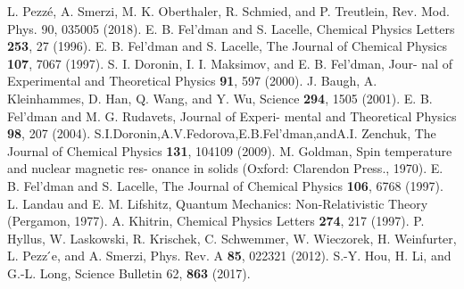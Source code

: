 \documentclass[%
 reprint,
superscriptaddress,
 amsmath,amssymb,
]{revtex4-2}
\begin{document}
\begin{thebibliography}{31}
    L. Pezz{\'e}, A. Smerzi, M. K. Oberthaler, R. Schmied, and P. Treutlein, Rev. Mod. Phys. 90, 035005 (2018).
    E. B. Fel'dman and S. Lacelle, Chemical Physics Letters {\bf 253}, 27 (1996).
    E. B. Fel'dman and S. Lacelle, The Journal of Chemical Physics {\bf 107}, 7067 (1997).
    S. I. Doronin, I. I. Maksimov, and E. B. Fel'dman, Jour- nal of Experimental and Theoretical Physics {\bf 91}, 597 (2000).
    J. Baugh, A. Kleinhammes, D. Han, Q. Wang, and Y. Wu, Science {\bf 294}, 1505 (2001).
    E. B. Fel’dman and M. G. Rudavets, Journal of Experi- mental and Theoretical Physics {\bf 98}, 207 (2004).
    S.I.Doronin,A.V.Fedorova,E.B.Fel’dman,andA.I. Zenchuk, The Journal of Chemical Physics {\bf 131}, 104109 (2009).
    M. Goldman, Spin temperature and nuclear magnetic res- onance in solids (Oxford: Clarendon Press., 1970).
    E. B. Fel’dman and S. Lacelle, The Journal of Chemical
    Physics {\bf 106}, 6768 (1997).
    L. Landau and E. M. Lifshitz, Quantum Mechanics:
    Non-Relativistic Theory (Pergamon, 1977).
    A. Khitrin, Chemical Physics Letters {\bf 274}, 217 (1997).
    P. Hyllus, W. Laskowski, R. Krischek, C. Schwemmer,
    W. Wieczorek, H. Weinfurter, L. Pezz ́e, and A. Smerzi,
    Phys. Rev. A {\bf 85}, 022321 (2012).
    S.-Y. Hou, H. Li, and G.-L. Long, Science Bulletin 62,
    {\bf 863} (2017). 
\end{thebibliography}
\end{document}
